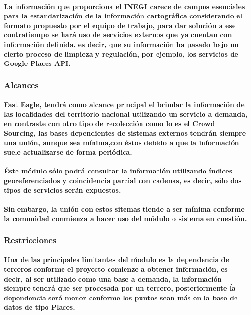       \paragraph{La información que proporciona el INEGI carece de campos esenciales para la estandarización de la información cartográfica considerando el formato propuesto por el equipo de trabajo, para dar solución a ese contratiempo se hará uso de servicios externos que ya cuentan con información definida, es decir, que su información ha pasado bajo un cierto proceso de limpieza y regulación, por ejemplo, los servicios de Google Places API.}
    \subsubsection{Alcances}
      \paragraph{Fast Eagle, tendrá como alcance principal el brindar la información de las localidades del territorio nacional utilizando un servicio a demanda, en contraste con otro tipo de recolección como lo es el Crowd Sourcing\cite{37}, las bases dependientes de sistemas externos tendrán siempre una unión, aunque sea mínima,con éstos debido a que la información suele actualizarse de forma periódica.}
      \paragraph{Éste módulo sólo podrá consultar la información utilizando índices georeferenciados y coincidencia parcial con cadenas, es decir, sólo dos tipos de servicios serán expuestos.} 
      \paragraph{Sin embargo, la unión con estos sitemas tiende a ser mínima conforme la comunidad conmienza a hacer uso del módulo o sistema en cuestión.}
    \subsubsection{Restricciones}
      \paragraph{Una de las principales limitantes del ḿodulo es la dependencia de terceros conforme el proyecto comienze a obtener información, es decir, al ser utilizado como una base a demanda, la información siempre tendrá que ser procesada por un tercero, posteriormente ĺa dependencia será menor conforme los puntos sean más en la base de datos de tipo Places.}
